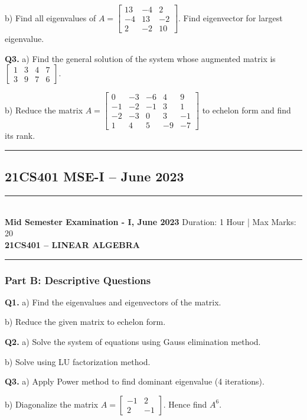 \documentclass[11pt,a4paper]{article}
\newcommand{\examheader}[4]{
\noindent\rule{\textwidth}{0.5pt}\\
\textbf{#1} \hfill Duration: #3 | Max Marks: #4\\
\textbf{#2}\\
\rule{\textwidth}{0.5pt}
\vspace{0.2cm}
}
\begin{document}
b) Find all eigenvalues of $A = \begin{bmatrix} 13 & -4 & 2 \\ -4 & 13 & -2 \\ 2 & -2 & 10 \end{bmatrix}$. Find eigenvector for largest eigenvalue.

\textbf{Q3.} a) Find the general solution of the system whose augmented matrix is $\begin{bmatrix} 1 & 3 & 4 & 7 \\ 3 & 9 & 7 & 6 \end{bmatrix}$.

b) Reduce the matrix $A = \begin{bmatrix} 0 & -3 & -6 & 4 & 9 \\ -1 & -2 & -1 & 3 & 1 \\ -2 & -3 & 0 & 3 & -1 \\ 1 & 4 & 5 & -9 & -7 \end{bmatrix}$ to echelon form and find its rank.

\vspace{0.5cm}
\hrule
\vspace{0.5cm}

\subsection{21CS401 MSE-I -- June 2023}
\examheader{Mid Semester Examination - I, June 2023}{21CS401 -- LINEAR ALGEBRA}{1 Hour}{20}

\subsubsection*{Part B: Descriptive Questions}

\textbf{Q1.} a) Find the eigenvalues and eigenvectors of the matrix.

b) Reduce the given matrix to echelon form.

\textbf{Q2.} a) Solve the system of equations using Gauss elimination method.

b) Solve using LU factorization method.

\textbf{Q3.} a) Apply Power method to find dominant eigenvalue (4 iterations).

b) Diagonalize the matrix $A = \begin{bmatrix} -1 & 2 \\ 2 & -1 \end{bmatrix}$. Hence find $A^6$.

\end{document}
